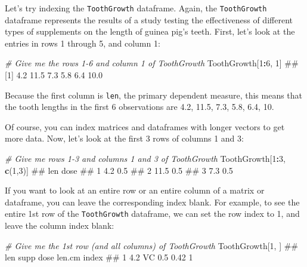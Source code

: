 \documentclass[]{book}
\newenvironment{Shaded}{\begin{snugshade}}{\end{snugshade}}
\newcommand{\KeywordTok}[1]{\textcolor[rgb]{0.13,0.29,0.53}{\textbf{#1}}}
\newcommand{\DecValTok}[1]{\textcolor[rgb]{0.00,0.00,0.81}{#1}}
\newcommand{\CommentTok}[1]{\textcolor[rgb]{0.56,0.35,0.01}{\textit{#1}}}
\newcommand{\OperatorTok}[1]{\textcolor[rgb]{0.81,0.36,0.00}{\textbf{#1}}}
\newcommand{\NormalTok}[1]{#1}
\theoremstyle{definition}
\theoremstyle{definition}
\theoremstyle{remark}
\begin{document}
Let's try indexing the \texttt{ToothGrowth} dataframe. Again, the
\texttt{ToothGrowth} dataframe represents the results of a study testing
the effectiveness of different types of supplements on the length of
guinea pig's teeth. First, let's look at the entries in rows 1 through
5, and column 1:

\begin{Shaded}
\begin{Highlighting}[]
\CommentTok{# Give me the rows 1-6 and column 1 of ToothGrowth}
\NormalTok{ToothGrowth[}\DecValTok{1}\OperatorTok{:}\DecValTok{6}\NormalTok{, }\DecValTok{1}\NormalTok{]}
\NormalTok{## [1]  4.2 11.5  7.3  5.8  6.4 10.0}
\end{Highlighting}
\end{Shaded}

Because the first column is \texttt{len}, the primary dependent measure,
this means that the tooth lengths in the first 6 observations are 4.2,
11.5, 7.3, 5.8, 6.4, 10.

Of course, you can index matrices and dataframes with longer vectors to
get more data. Now, let's look at the first 3 rows of columns 1 and 3:

\begin{Shaded}
\begin{Highlighting}[]
\CommentTok{# Give me rows 1-3 and columns 1 and 3 of ToothGrowth}
\NormalTok{ToothGrowth[}\DecValTok{1}\OperatorTok{:}\DecValTok{3}\NormalTok{, }\KeywordTok{c}\NormalTok{(}\DecValTok{1}\NormalTok{,}\DecValTok{3}\NormalTok{)]}
\NormalTok{##    len dose}
\NormalTok{## 1  4.2  0.5}
\NormalTok{## 2 11.5  0.5}
\NormalTok{## 3  7.3  0.5}
\end{Highlighting}
\end{Shaded}

If you want to look at an entire row or an entire column of a matrix or
dataframe, you can leave the corresponding index blank. For example, to
see the entire 1st row of the \texttt{ToothGrowth} dataframe, we can set
the row index to 1, and leave the column index blank:

\begin{Shaded}
\begin{Highlighting}[]
\CommentTok{# Give me the 1st row (and all columns) of ToothGrowth}
\NormalTok{ToothGrowth[}\DecValTok{1}\NormalTok{, ]}
\NormalTok{##   len supp dose len.cm index}
\NormalTok{## 1 4.2   VC  0.5   0.42     1}
\end{Highlighting}
\end{Shaded}
\end{document}
